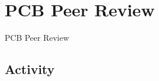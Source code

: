 \documentclass{beamer}
\begin{document}
\begin{frame}
\titlepage

\setcounter{tocdepth}{1}
\tableofcontents
\end{frame}


\section{PCB Peer Review} %
\begin{frame}
\centering \huge PCB Peer Review
\end{frame}

\subsection{Activity}
\end{document}
